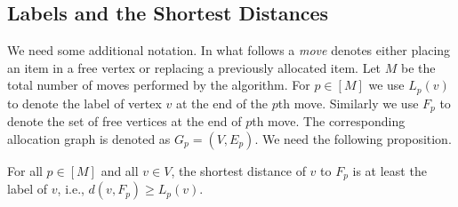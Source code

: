 \subsection{Labels and the Shortest Distances } \label{sec:proof}
%
We need some additional notation. In what follows  a \emph{move} denotes either placing an item in a free vertex or replacing a previously allocated item.
Let $M$ be the total number of moves performed by the algorithm. For $p\in [M]$ we use $L_p(v)$ to denote the label of vertex $v$ at the end of the $p$th move. Similarly we use $F_p$ to denote the set of free vertices at the end of $p$th move. The corresponding allocation graph is denoted as $G_p=(V,E_p)$.
We need the following proposition.
\begin{proposition}\label{prop:lev}
For all $p\in[M]$ and all $v\in V$, the shortest distance of $v$ to $F_p$ is at least the label of $v$, i.e., $d(v,F_p)\ge L_p(v)$.
\end{proposition}
